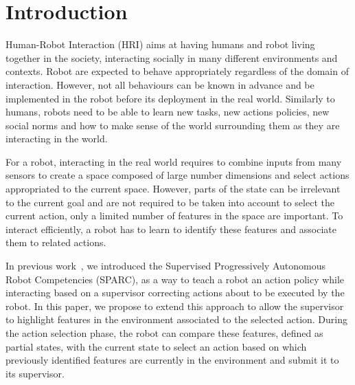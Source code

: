 \documentclass[letterpaper]{article} %
\begin{document}
\section{Introduction}

Human-Robot Interaction (HRI) aims at having humans and robot living together
in the society, interacting socially in many different environments and
contexts. Robot are expected to behave appropriately regardless of the domain
of interaction. However, not all behaviours can be known in advance and be
implemented in the robot before its deployment in the real world. Similarly to
 humans, robots need
to be able to learn new tasks, new actions policies, new social norms and how
to make sense of the world surrounding them as they are interacting in the world.

For a robot, interacting in the real world requires to combine inputs
 from many sensors to create a space composed of large number dimensions and
select actions appropriated to the current space. However,
 parts of the state can be irrelevant to the current goal and are not required
 to be taken into account to select the current action, only a limited number of
 features in the space are important. To interact efficiently, a robot has to
 learn to identify these features and associate them to related actions.


In previous work~\cite{senft2015sparc,senft2017supervised}, we introduced the
Supervised Progressively Autonomous Robot Competencies (SPARC), as a way to
teach a robot an action policy while interacting based on a supervisor
correcting actions about to be executed by the robot. In this paper, we propose
to extend this approach to allow the supervisor to highlight features in the
environment associated to the selected action. During the action selection
phase, the robot can compare these features, defined as partial states, with the
current state to select an action based on which previously identified
features are currently in the environment and submit it to its supervisor.
\end{document}

